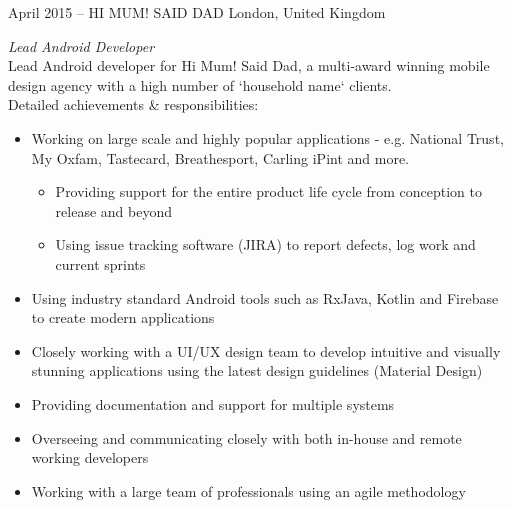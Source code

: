 \documentclass[]{friggeri-cv} %
\begin{document}
\begin{entrylist}
\entry
{April 2015 -- }
{HI MUM! SAID DAD}
{London, United Kingdom}
{\emph{Lead Android Developer} \\
Lead Android developer for Hi Mum! Said Dad, a multi-award winning mobile design agency with a high number of `household name` clients.\\

Detailed achievements \& responsibilities:
\begin{itemize}
\item Working on large scale and highly popular applications - e.g. National Trust, My Oxfam, Tastecard, Breathesport, Carling iPint and more.
\begin{itemize}
\item Providing support for the entire product life cycle from conception to release and beyond 
\item Using issue tracking software (JIRA) to report defects, log work and current sprints
\end{itemize}
\item Using industry standard Android tools such as RxJava, Kotlin and Firebase to create modern applications
\item Closely working with a UI/UX design team to develop intuitive and visually stunning applications using the latest design guidelines (Material Design)
\item Providing documentation and support for multiple systems
\item Overseeing and communicating closely with both in-house and remote working developers
\item Working with a large team of professionals using an agile methodology
\end{itemize}

}
\end{entrylist}
\end{document}
